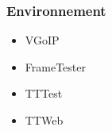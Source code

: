 \begin{frame}
    \frametitle{Environnement}
    \begin{itemize}
        \item VGoIP
        \item FrameTester
        \item TTTest
        \item TTWeb
    \end{itemize}
\end{frame}